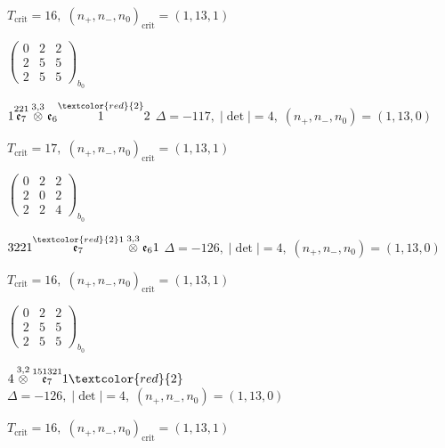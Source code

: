 \documentclass[10pt]{article}
\begin{document}
\hspace{1em}$T_{\text{crit}}=16,\; (n_+,n_-,n_0)_{\text{crit}}=(1,13,1)$

\hspace{2em}$\left(\begin{smallmatrix}0 & 2 & 2 \\ 2 & 5 & 5 \\ 2 & 5 & 5\end{smallmatrix}\right)_{\!b_0}$

\smallskip

$1\overset{221}{\mathfrak{e}_7}\overset{3,3}{\otimes}\mathfrak{e}_6\overset{\textcolor{red}{2}}{1}2$ \quad $\Delta=-117,\; |\det|=4,\; (n_+,n_-,n_0)=(1,13,0)$

\hspace{1em}$T_{\text{crit}}=17,\; (n_+,n_-,n_0)_{\text{crit}}=(1,13,1)$

\hspace{2em}$\left(\begin{smallmatrix}0 & 2 & 2 \\ 2 & 0 & 2 \\ 2 & 2 & 4\end{smallmatrix}\right)_{\!b_0}$

\smallskip

$3221\overset{\textcolor{red}{2}1}{\mathfrak{e}_7}\overset{3,3}{\otimes}\mathfrak{e}_61$ \quad $\Delta=-126,\; |\det|=4,\; (n_+,n_-,n_0)=(1,13,0)$

\hspace{1em}$T_{\text{crit}}=16,\; (n_+,n_-,n_0)_{\text{crit}}=(1,13,1)$

\hspace{2em}$\left(\begin{smallmatrix}0 & 2 & 2 \\ 2 & 5 & 5 \\ 2 & 5 & 5\end{smallmatrix}\right)_{\!b_0}$

\smallskip

$4\overset{3,2}{\otimes}\overset{151321}{\mathfrak{e}_7}1\textcolor{red}{2}$ \quad $\Delta=-126,\; |\det|=4,\; (n_+,n_-,n_0)=(1,13,0)$

\hspace{1em}$T_{\text{crit}}=16,\; (n_+,n_-,n_0)_{\text{crit}}=(1,13,1)$
\end{document}
